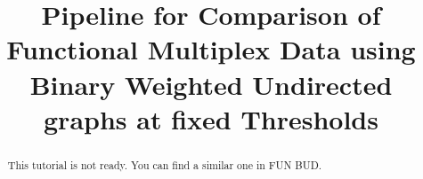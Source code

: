 \documentclass[justified]{tufte-handout}
\title{Pipeline for Comparison of Functional Multiplex Data using Binary Weighted Undirected graphs at fixed Thresholds}
\begin{document}
\maketitle

\begin{abstract}
\noindent
This tutorial is not ready. You can find a similar one in FUN BUD.
\end{abstract}
\end{document}

